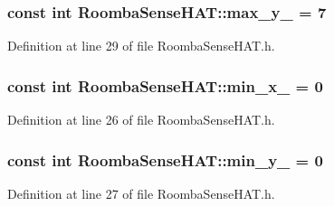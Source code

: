 \subsubsection[{\texorpdfstring{max\+\_\+y\+\_\+}{max_y_}}]{\setlength{\rightskip}{0pt plus 5cm}const int Roomba\+Sense\+H\+A\+T\+::max\+\_\+y\+\_\+ = 7\hspace{0.3cm}{\ttfamily [protected]}}\hypertarget{class_roomba_sense_h_a_t_ac32eb5edac9e6863af30618d5c3201e7}{}\label{class_roomba_sense_h_a_t_ac32eb5edac9e6863af30618d5c3201e7}


Definition at line 29 of file Roomba\+Sense\+H\+A\+T.\+h.

\subsubsection[{\texorpdfstring{min\+\_\+x\+\_\+}{min_x_}}]{\setlength{\rightskip}{0pt plus 5cm}const int Roomba\+Sense\+H\+A\+T\+::min\+\_\+x\+\_\+ = 0\hspace{0.3cm}{\ttfamily [protected]}}\hypertarget{class_roomba_sense_h_a_t_ae39e221ca1b6f9045a77d7befd66afe5}{}\label{class_roomba_sense_h_a_t_ae39e221ca1b6f9045a77d7befd66afe5}


Definition at line 26 of file Roomba\+Sense\+H\+A\+T.\+h.

\subsubsection[{\texorpdfstring{min\+\_\+y\+\_\+}{min_y_}}]{\setlength{\rightskip}{0pt plus 5cm}const int Roomba\+Sense\+H\+A\+T\+::min\+\_\+y\+\_\+ = 0\hspace{0.3cm}{\ttfamily [protected]}}\hypertarget{class_roomba_sense_h_a_t_a121e53dc84befcf387724db98aaacf67}{}\label{class_roomba_sense_h_a_t_a121e53dc84befcf387724db98aaacf67}


Definition at line 27 of file Roomba\+Sense\+H\+A\+T.\+h.

